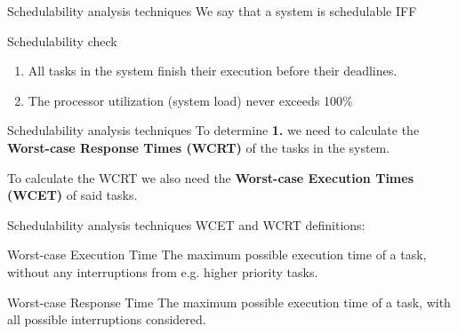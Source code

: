 \begin{frame}{Schedulability analysis techniques}
    We say that a system is schedulable IFF
    \begin{block}{Schedulability check}
        \begin{enumerate}
            \item All tasks in the system finish their execution before their deadlines.
            \item The processor utilization (system load) never exceeds 100\% 
        \end{enumerate}
    \end{block}
\end{frame}

\begin{frame}{Schedulability analysis techniques}
    To determine \textbf{1.} we need to calculate the \textbf{Worst-case Response
    Times (WCRT)} of the tasks in the system.

    \vspace{1cm}

    To calculate the WCRT we also need the \textbf{Worst-case Execution Times (WCET)} of
    said tasks.
    
\end{frame}

\begin{frame}{Schedulability analysis techniques}
    WCET and WCRT definitions:
    \vspace{1em}

    \begin{block}{Worst-case Execution Time}
        The maximum possible execution time of a task, without any
        interruptions from e.g. higher priority tasks.
    \end{block} 

    \vspace{1em}

    \begin{block}{Worst-case Response Time}
        The maximum possible execution time of a task, with all
        possible interruptions considered.
    \end{block} 
\end{frame}
